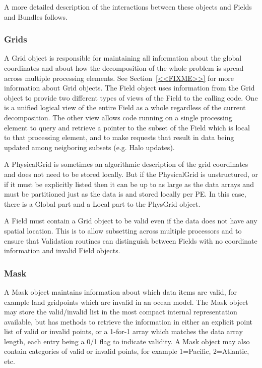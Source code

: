
A more detailed description of the interactions between
these objects and Fields and Bundles follows.

\subsubsection{Grids}

A Grid object is responsible for
maintaining all information about the global coordinates and about how
the decomposition of the whole problem is spread across multiple
processing elements.  
See Section~\ref{<<FIXME>>} for more information about Grid objects.  
The Field object uses information from the Grid object to provide
two different types of views of the Field to the calling code.
One is a unified logical view of the entire Field as a whole
regardless of the current decomposition.  The other view allows code
running on a single processing element to query and retrieve a pointer 
to the subset of the Field which is local to that processing element,
and to make requests that result in data being updated among neigboring
subsets (e.g. Halo updates).

A PhysicalGrid is sometimes an algorithmic description of the
grid coordinates and does not need to be stored locally.  But if
the PhysicalGrid is unstructured, or if it must be explicitly
listed then it can be up to as large as the data arrays and
must be partitioned just as the data is and stored locally per PE.
In this case, there is a Global part and a Local part to the PhysGrid
object.

A Field must contain a Grid object to be valid even if the data does not
have any spatial location.  This is to allow subsetting across multiple
processors and to ensure that Validation routines can distinguish between
Fields with no coordinate information and invalid Field objects.

\subsubsection{Mask}

A Mask object maintains information about which data items are
valid, for example land gridpoints which are invalid in an ocean model.
The Mask object may store the valid/invalid list in the most 
compact internal representation available, but has methods to
retrieve the information in either an explicit point list of
valid or invalid points, or a 1-for-1 array which matches the
data array length, each entry being a 0/1 flag to indicate validity.
A Mask object may also contain categories of valid or invalid points, 
for example 1=Pacific, 2=Atlantic, etc.

